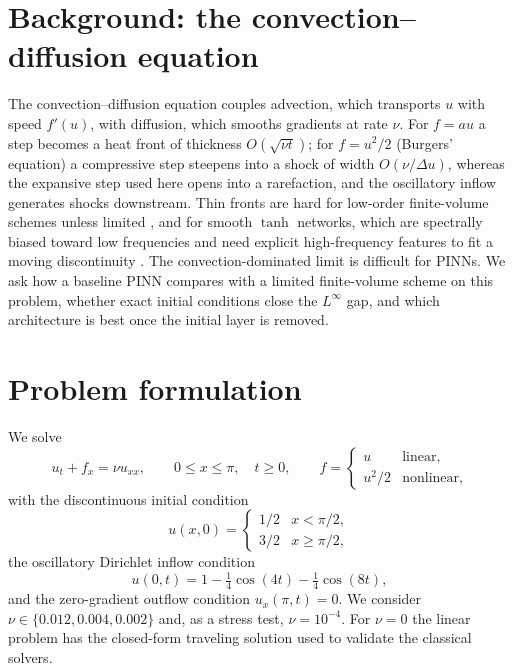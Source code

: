 \documentclass[11pt]{article}
\begin{document}
\section{Background: the convection--diffusion equation}
\label{sec:background}
The convection--diffusion equation couples advection, which transports $u$ with
speed $f'(u)$, with diffusion, which smooths gradients at rate $\nu$. For
$f=au$ a step becomes a heat front of thickness $O(\sqrt{\nu t})$; for
$f=u^2/2$ (Burgers' equation) a compressive step steepens into a shock of width
$O(\nu/\Delta u)$, whereas the expansive step used here opens into a
rarefaction, and the oscillatory inflow generates shocks downstream. Thin
fronts are hard for low-order finite-volume
schemes unless limited \citep{leveque2002}, and for smooth $\tanh$ networks,
which are spectrally biased toward low frequencies \citep{rahaman2019} and need
explicit high-frequency features to fit a moving discontinuity
\citep{tancik2020}. The convection-dominated limit is difficult for PINNs. We
ask how a baseline PINN compares with a limited finite-volume scheme on this
problem, whether exact initial conditions close the $L^\infty$ gap, and which
architecture is best once the initial layer is removed.

\section{Problem formulation}
\label{sec:problem}
We solve
\begin{equation}
  u_t + f_x = \nu u_{xx}, \qquad 0 \le x \le \pi,\quad t \ge 0,
  \qquad
  f =
  \begin{cases} u & \text{linear},\\ u^2/2 & \text{nonlinear},
  \end{cases}
\end{equation}
with the discontinuous initial condition
\begin{equation}
  u(x,0) =
  \begin{cases} 1/2 & x < \pi/2,\\ 3/2 & x \ge \pi/2,
  \end{cases}
  \label{eq:ic}
\end{equation}
the oscillatory Dirichlet inflow condition
\begin{equation}
  u(0,t) = 1 - \tfrac14\cos(4t) - \tfrac14\cos(8t),
\end{equation}
and the zero-gradient outflow condition $u_x(\pi,t) = 0$. We consider
$\nu \in \{0.012, 0.004, 0.002\}$ and, as a stress test, $\nu = 10^{-4}$.
For $\nu = 0$ the linear problem has the closed-form traveling solution used
to validate the classical solvers.
\end{document}
